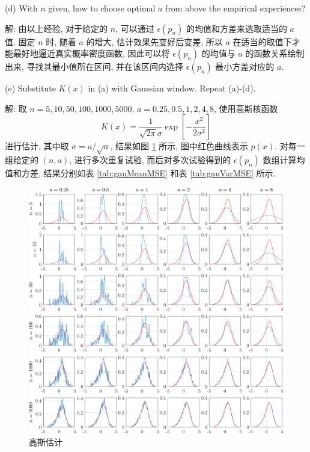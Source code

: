 \documentclass{article}
\begin{document}
(d) With $n$ given, how to choose optimal $a$ from above the empirical experiences?

解: 由以上经验, 对于给定的 $n$, 可以通过 $\epsilon(p_n)$ 的均值和方差来选取适当的 $a$ 值. 固定 $n$ 时, 随着 $a$ 的增大, 估计效果先变好后变差, 所以 $a$ 在适当的取值下才能最好地逼近真实概率密度函数, 因此可以将 $\epsilon(p_n)$ 的均值与 $a$ 的函数关系绘制出来, 寻找其最小值所在区间, 并在该区间内选择 $\epsilon(p_n)$ 最小方差对应的 $a$.

(e) Substitute $K(x)$ in (a) with Gaussian window. Repeat (a)-(d).

解: 取 $n=5,10,50,100,1000,5000$, $a=0.25,0.5,1,2,4,8$, 使用高斯核函数
\begin{equation}
  K(x)=\frac{1}{\sqrt{2\pi}\sigma}\exp\left[-\frac{x^2}{2\sigma^2}\right]
\end{equation}
进行估计, 其中取 $\sigma=a/\sqrt{n}$, 结果如图 \ref{fig:gauwin} 所示, 图中红色曲线表示 $p(x)$. 对每一组给定的 $(n,a)$, 进行多次重复试验, 而后对多次试验得到的 $\epsilon(p_n)$ 数组计算均值和方差, 结果分别如表 \ref{tab:gauMeanMSE} 和表 \ref{tab:gauVarMSE} 所示.

\begin{figure}[htbp]
  \centering
  \includegraphics[width=7in]{gaussianWindow.pdf}
  \caption{高斯估计}
  \label{fig:gauwin}
\end{figure}
\end{document}
